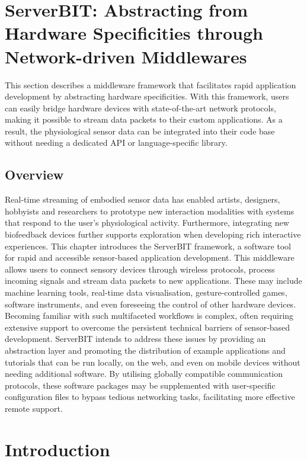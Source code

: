 \section{ServerBIT: Abstracting from Hardware Specificities through Network-driven Middlewares}

This section describes a middleware framework that facilitates rapid application development by abstracting hardware specificities. With this framework, users can easily bridge hardware devices with state-of-the-art network protocols, making it possible to stream data packets to their custom applications. As a result, the physiological sensor data can be integrated into their code base without needing a dedicated API or language-specific library.

\subsection{Overview}

Real-time streaming of embodied sensor data has enabled artists, designers, hobbyists and researchers to prototype new interaction modalities with systems that respond to the user’s physiological activity. Furthermore, integrating new biofeedback devices further supports exploration when developing rich interactive experiences. This chapter introduces the ServerBIT framework, a software tool for rapid and accessible sensor-based application development. This middleware allows users to connect sensory devices through wireless protocols, process incoming signals and stream data packets to new applications. These may include machine learning tools, real-time data visualisation, gesture-controlled games, software instruments, and even foreseeing the control of other hardware devices. Becoming familiar with such multifaceted workflows is complex, often requiring extensive support to overcome the persistent technical barriers of sensor-based development. ServerBIT intends to address these issues by providing an abstraction layer and promoting the distribution of example applications and tutorials that can be run locally, on the web, and even on mobile devices without needing additional software. By utilising globally compatible communication protocols, these software packages may be supplemented with user-specific configuration files to bypass tedious networking tasks, facilitating more effective remote support.

\section{Introduction}

